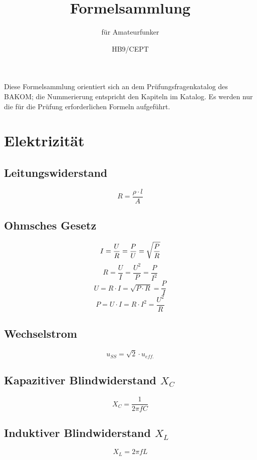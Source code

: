 \documentclass[10pt,landscape]{scrartcl}
\author{HB9/CEPT}
\date{}
\title{Formelsammlung}
\subtitle{f\"ur Amateurfunker}
\begin{document}
\setlength{\columnsep}{1cm}
\begin{multicols}{3}

\maketitle

\noindent
Diese Formelsammlung orientiert sich an dem Prüfungsfragenkatalog des BAKOM;
die Nummerierung entspricht den Kapiteln im Katalog.
Es werden nur die für die Prüfung erforderlichen Formeln aufgeführt.

\section{Elektrizität}

\noindent
{}

\subsection*{Leitungswiderstand}

$$ R = \frac{\rho \cdot l}{A} $$

\subsection*{Ohmsches Gesetz}

$$ I = \frac{U}{R} = \frac{P}{U} = \sqrt{P \over R} $$
$$ R = \frac{U}{I} = \frac{U^2}{P} = \frac{P}{I^2} $$
$$ U= R \cdot I = \sqrt{P\cdot R} = \frac{P}{I} $$
$$ P = U \cdot I = R \cdot I^2 = \frac{U^2}{R} $$

\subsection*{Wechselstrom}

$$ u_{SS} = \sqrt{2}\cdot u_{eff.} $$

\subsection*{Kapazitiver Blindwiderstand $X_C$}
$$ X_C = \frac{1}{2 \pi f C} $$

\subsection*{Induktiver Blindwiderstand $X_L$}
$$ X_L = 2 \pi f L $$


\end{multicols}
\end{document}
